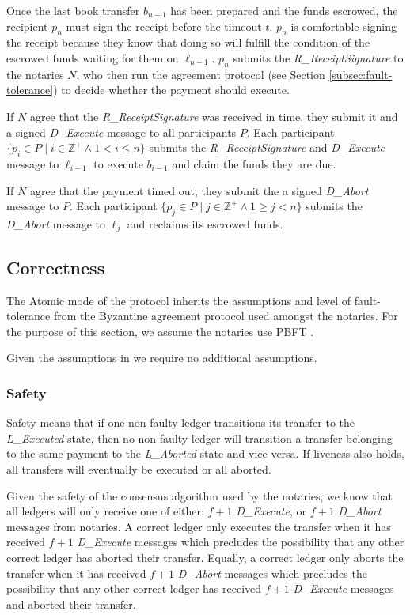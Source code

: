 \documentclass[letterpaper,twocolumn,10pt]{article}
\begin{document}
Once the last book transfer $b_{n-1}$ has been prepared and the funds escrowed, the recipient $p_n$ must sign the receipt before the timeout $t$. $p_n$ is comfortable signing the receipt because they know that doing so will fulfill the condition of the escrowed funds waiting for them on $\ell_{n-1}$. $p_n$ submits the \textit{R\_ReceiptSignature} to the notaries $N$, who then run the agreement protocol (see Section \ref{subsec:fault-tolerance}) to decide whether the payment should execute.

If $N$ agree that the \textit{R\_ReceiptSignature} was received in time, they submit it and a signed \textit{D\_Execute} message to all participants $P$. Each participant $ \{ p_i \in P \mid i \in \mathbb{Z}^+ \land 1 < i \leq n \} $ submits the \textit{R\_ReceiptSignature} and \textit{D\_Execute} message to $\ell_{i-1}$ to execute $b_{i-1}$ and claim the funds they are due.

If $N$ agree that the payment timed out, they submit the a signed \textit{D\_Abort} message to $P$. Each participant $ \{ p_j \in P \mid j \in \mathbb{Z}^+ \land 1 \geq j < n \} $ submits the \textit{D\_Abort} message to $\ell_j$ and reclaims its escrowed funds. 


\subsection{Correctness}

The Atomic mode of the protocol inherits the assumptions and level of fault-tolerance from the Byzantine agreement protocol used amongst the notaries. For the purpose of this section, we assume the notaries use PBFT \cite{castro1999practical}.

Given the assumptions in \cite{castro1999practical} we require no additional assumptions.


\subsubsection{Safety}

Safety means that if one non-faulty ledger transitions its transfer to the \textit{L\_Executed} state, then no non-faulty ledger will transition a transfer belonging to the same payment to the \textit{L\_Aborted} state and vice versa. If liveness also holds, all transfers will eventually be executed or all aborted.

Given the safety of the consensus algorithm used by the notaries, 
we know that all ledgers will only receive one of either: $f + 1$ \textit{D\_Execute}, or $f + 1$ \textit{D\_Abort} messages from notaries. A correct ledger only executes the transfer when it has received $f + 1$ \textit{D\_Execute} messages which precludes the possibility that any other correct ledger has aborted their transfer. Equally, a correct ledger only aborts the transfer when it has received $f + 1$ \textit{D\_Abort} messages which precludes the possibility that any other correct ledger has received $f + 1$ \textit{D\_Execute} messages and aborted their transfer.
\end{document}
